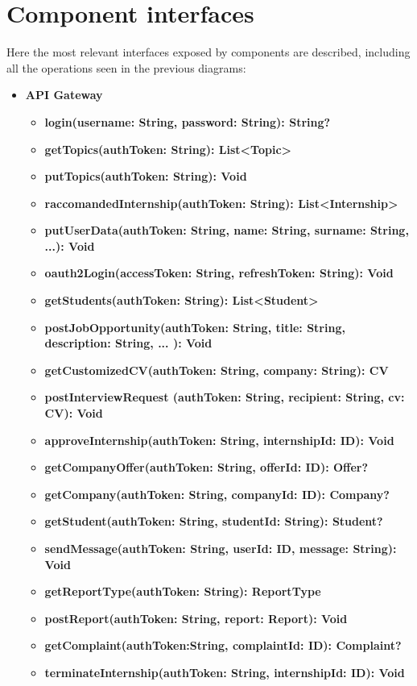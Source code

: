\section{Component interfaces}
Here the most relevant interfaces exposed by components are described, including all the operations
seen in the previous diagrams:
\begin{itemize}
    \item \textbf{API Gateway}
          \begin{itemize}
              \item \textbf{login(username: String, password: String): String?}
              \item \textbf{getTopics(authToken: String): List<Topic>}
              \item \textbf{putTopics(authToken: String): Void}
              \item \textbf{raccomandedInternship(authToken: String): List<Internship>}
              \item \textbf{putUserData(authToken: String, name: String, surname: String, ...): Void}
              \item \textbf{oauth2Login(accessToken: String, refreshToken: String): Void}
              \item \textbf{getStudents(authToken: String): List<Student>}
              \item \textbf{postJobOpportunity(authToken: String, title: String, description: String, ... ): Void}
              \item \textbf{getCustomizedCV(authToken: String, company: String): CV}
              \item \textbf{postInterviewRequest (authToken: String, recipient: String, cv: CV): Void}
              \item \textbf{approveInternship(authToken: String, internshipId: ID): Void}
              \item \textbf{getCompanyOffer(authToken: String, offerId: ID): Offer?}
              \item \textbf{getCompany(authToken: String, companyId: ID): Company?}
              \item 
              \textbf{getStudent(authToken: String, studentId: String): Student?}
              \item 
              \textbf{sendMessage(authToken: String, userId: ID, message: String): Void}
              \item \textbf{getReportType(authToken: String): ReportType}
              \item \textbf{postReport(authToken: String, report: Report): Void}
              \item \textbf{getComplaint(authToken:String, complaintId: ID): Complaint?}
              \item \textbf{terminateInternship(authToken: String, internshipId: ID): Void}
          \end{itemize}
             

\end{itemize}
